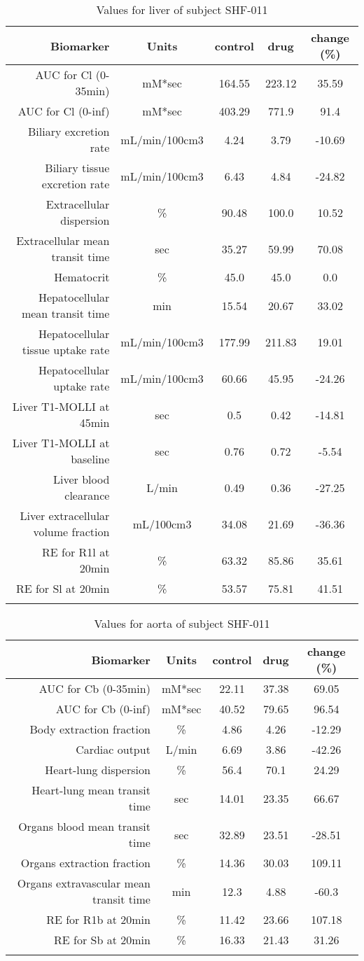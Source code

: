 \documentclass{epflreport}%
\begin{document}
%
\clearpage%
\begin{longtable}{rcccc}%
\hline%
Biomarker&Units&control&drug&change (\%)\\%
\hline%
AUC for Cl (0{-}35min)&mM*sec&164.55&223.12&35.59\\%
AUC for Cl (0{-}inf)&mM*sec&403.29&771.9&91.4\\%
Biliary excretion rate&mL/min/100cm3&4.24&3.79&{-}10.69\\%
Biliary tissue excretion rate&mL/min/100cm3&6.43&4.84&{-}24.82\\%
Extracellular dispersion&\%&90.48&100.0&10.52\\%
Extracellular mean transit time&sec&35.27&59.99&70.08\\%
Hematocrit&\%&45.0&45.0&0.0\\%
Hepatocellular mean transit time&min&15.54&20.67&33.02\\%
Hepatocellular tissue uptake rate&mL/min/100cm3&177.99&211.83&19.01\\%
Hepatocellular uptake rate&mL/min/100cm3&60.66&45.95&{-}24.26\\%
Liver T1{-}MOLLI at 45min&sec&0.5&0.42&{-}14.81\\%
Liver T1{-}MOLLI at baseline&sec&0.76&0.72&{-}5.54\\%
Liver blood clearance&L/min&0.49&0.36&{-}27.25\\%
Liver extracellular volume fraction&mL/100cm3&34.08&21.69&{-}36.36\\%
RE for R1l at 20min&\%&63.32&85.86&35.61\\%
RE for Sl at 20min&\%&53.57&75.81&41.51\\%
\hline%
\caption{Values for liver of subject SHF-011} \\%
\end{longtable}%
\begin{longtable}{rcccc}%
\hline%
Biomarker&Units&control&drug&change (\%)\\%
\hline%
AUC for Cb (0{-}35min)&mM*sec&22.11&37.38&69.05\\%
AUC for Cb (0{-}inf)&mM*sec&40.52&79.65&96.54\\%
Body extraction fraction&\%&4.86&4.26&{-}12.29\\%
Cardiac output&L/min&6.69&3.86&{-}42.26\\%
Heart{-}lung dispersion&\%&56.4&70.1&24.29\\%
Heart{-}lung mean transit time&sec&14.01&23.35&66.67\\%
Organs blood mean transit time&sec&32.89&23.51&{-}28.51\\%
Organs extraction fraction&\%&14.36&30.03&109.11\\%
Organs extravascular mean transit time&min&12.3&4.88&{-}60.3\\%
RE for R1b at 20min&\%&11.42&23.66&107.18\\%
RE for Sb at 20min&\%&16.33&21.43&31.26\\%
\hline%
\caption{Values for aorta of subject SHF-011} \\%
\end{longtable}%
\clearpage%
\end{document}
